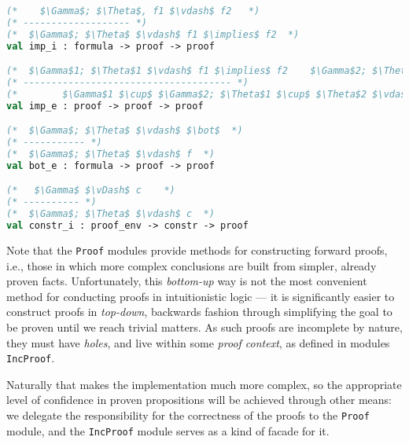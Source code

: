 \documentclass[english, mgr]{iithesis}
\renewcommand{\tt}[1]{\texttt{\small{#1}}}
\renewcommand{\it}[1]{\textit{#1}}
\begin{document}
\begin{lstlisting}[mathescape, language=OCaml]
(*    $\Gamma$; $\Theta$, f1 $\vdash$ f2   *)
(* ------------------- *)
(*  $\Gamma$; $\Theta$ $\vdash$ f1 $\implies$ f2  *)
val imp_i : formula -> proof -> proof

(*  $\Gamma$1; $\Theta$1 $\vdash$ f1 $\implies$ f2    $\Gamma$2; $\Theta$2 $\vdash$ f2  *)
(* ------------------------------------- *)
(*        $\Gamma$1 $\cup$ $\Gamma$2; $\Theta$1 $\cup$ $\Theta$2 $\vdash$ f2         *)
val imp_e : proof -> proof -> proof

(*  $\Gamma$; $\Theta$ $\vdash$ $\bot$  *)
(* ----------- *)
(*  $\Gamma$; $\Theta$ $\vdash$ f  *)
val bot_e : formula -> proof -> proof

(*   $\Gamma$ $\vDash$ c    *)
(* ---------- *)
(*  $\Gamma$; $\Theta$ $\vdash$ c  *)
val constr_i : proof_env -> constr -> proof
\end{lstlisting}
Note that the \tt{Proof} modules provide methods for constructing forward proofs, i.e., those in which more complex conclusions are built from simpler, already proven facts.
Unfortunately, this \it{bottom-up} way is not the most convenient method for conducting proofs in intuitionistic logic --- it is significantly easier to construct proofs in \it{top-down}, backwards fashion through simplifying the goal to be proven until we reach trivial matters.
As such proofs are incomplete by nature, they must have \it{holes},
and live within some \it{proof context}, as defined in modules \tt{IncProof}.

Naturally that makes the implementation much more complex, so the appropriate level of confidence in proven propositions will be achieved through other means:
we delegate the responsibility for the correctness of the proofs to the \tt{Proof} module, and the \tt{IncProof} module serves as a kind of facade for it.
\end{document}

